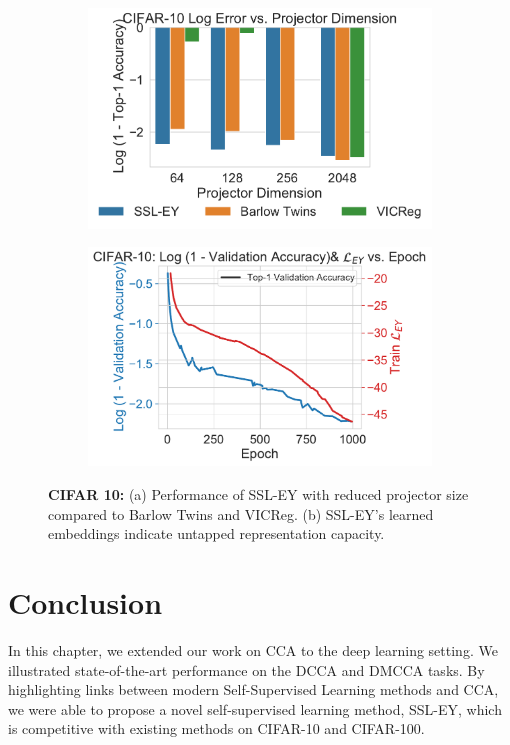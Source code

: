 \begin{figure}[H]
    \begin{subfigure}[b]{0.47\textwidth}
        \centering
        \includegraphics[width=\textwidth]{figures/SSL/cifar10_proj_dim_log_error}
        \caption{}
        \label{fig: ssl projector dimensions 10}
    \end{subfigure}
    \begin{subfigure}[b]{0.47\textwidth}
        \centering
        \includegraphics[width=\textwidth]{figures/SSL/cifar10_corr_vs_acc_log_error}
        \caption{}
        \label{fig:ssl learning curve cifar10 vs corr}
    \end{subfigure}
    \caption{\textbf{CIFAR 10: }(a) Performance of SSL-EY with reduced projector size compared to Barlow Twins and VICReg. (b) SSL-EY's learned embeddings indicate untapped representation capacity.}
    \label{fig: ssl projector cifar 10}
\end{figure}

\section{Conclusion}

In this chapter, we extended our work on CCA to the deep learning setting.
We illustrated state-of-the-art performance on the DCCA and DMCCA tasks.
By highlighting links between modern Self-Supervised Learning methods and CCA, we were able to propose a novel self-supervised learning method, SSL-EY, which is competitive with existing methods on CIFAR-10 and CIFAR-100.
